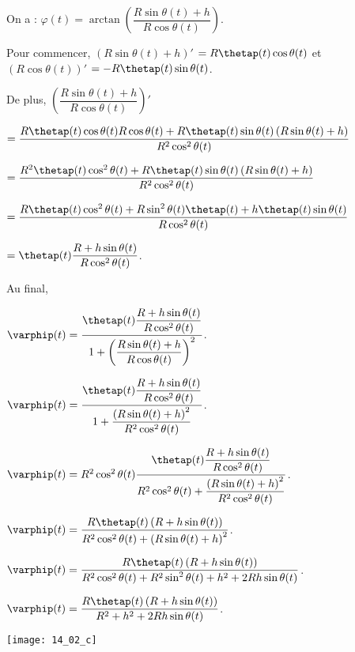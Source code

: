 On a : $ \varphi(t)=\arctan \left( \dfrac{R\sin\theta(t)+h}{R \cos\theta(t)}\right)$.

Pour commencer, $\left( R\sin\theta(t)+h\right)'$ $=R\thetap(t)\cos\theta(t) $
et $\left( R \cos\theta(t)\right)'$ $=- R \thetap(t)\sin\theta(t)$.

De plus, 
$\left( \dfrac{R\sin\theta(t)+h}{R \cos\theta(t)}\right)'$

$ = \dfrac{R\thetap(t)\cos\theta(t) R \cos\theta(t) + R \thetap(t)\sin\theta(t) \left( R\sin\theta(t)+h\right) }{ R^2 \cos^2\theta(t)}$

$ = \dfrac{R^2\thetap(t)\cos^2\theta(t)  + R \thetap(t)\sin\theta(t) \left( R\sin\theta(t)+h\right) }{ R^2 \cos^2\theta(t)}$


$ = \dfrac{R\thetap(t)\cos^2\theta(t)  +   R\sin^2\theta(t)\thetap(t)+h\thetap(t)\sin\theta(t)}{ R \cos^2\theta(t)}$

$ = \thetap(t)\dfrac{R+h\sin\theta(t)}{ R \cos^2\theta(t)}$.


Au final, 

$ \varphip(t) =  \dfrac{\thetap(t)\dfrac{R+h\sin\theta(t)}{ R \cos^2\theta(t)}}{1+\left( \dfrac{R\sin\theta(t)+h}{R \cos\theta(t)}\right)^2}$.

$ \varphip(t) =  \dfrac{\thetap(t)\dfrac{R+h\sin\theta(t)}{ R \cos^2\theta(t)}}{1+ \dfrac{\left(R\sin\theta(t)+h\right)^2}{R^2 \cos^2\theta(t)}}$.

$ \varphip(t) =  R^2 \cos^2\theta(t) \dfrac{\thetap(t)\dfrac{R+h\sin\theta(t)}{ R \cos^2\theta(t)}}{R^2 \cos^2\theta(t)+ \dfrac{\left(R\sin\theta(t)+h\right)^2}{R^2 \cos^2\theta(t)}}$.

$ \varphip(t) =  \dfrac{R \thetap(t)\left(R+h\sin\theta(t)\right)}{R^2 \cos^2\theta(t)+ \left(R\sin\theta(t)+h\right)^2}$.

$ \varphip(t) =  \dfrac{R \thetap(t)\left(R+h\sin\theta(t)\right)}{R^2 \cos^2\theta(t)+ R^2\sin^2\theta(t)+h^2+2 Rh\sin\theta(t)}$.

$ \varphip(t) =  \dfrac{R \thetap(t)\left(R+h\sin\theta(t)\right)}{R^2+h^2+2 Rh\sin\theta(t)}$.
\ifprof
\else
\fi


\begin{center}
\texttt{[image: 14\_02\_c]}
\end{center}

